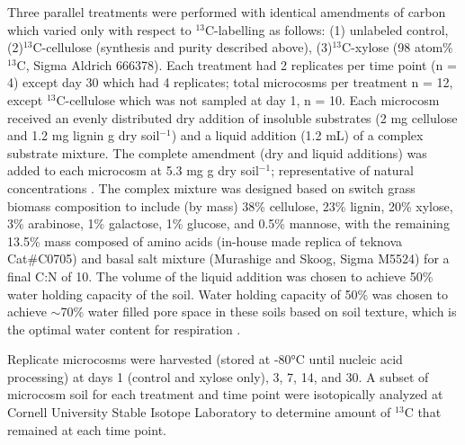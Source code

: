 Three parallel treatments were performed with identical amendments of carbon
which varied only with respect to $^{13}$C-labelling as follows:
(1) unlabeled control,(2)$^{13}$C-cellulose (synthesis and purity
described above), (3)$^{13}$C-xylose (98 atom\%
$^{13}$C, Sigma Aldrich 666378). Each treatment had 2 replicates
per time point (n = 4) except day 30 which had 4 replicates; total microcosms
per treatment n = 12, except $^{13}$C-cellulose which was not
sampled at day 1, n = 10. Each microcosm received an evenly distributed dry
addition of insoluble substrates (2 mg cellulose and 1.2 mg lignin g dry
soil$^{-1}$) and a liquid addition (1.2 mL) of a complex substrate
mixture. The complete amendment (dry and liquid additions) was added to each
microcosm at 5.3 mg g dry soil$^{-1}$; representative of natural
concentrations \cite{Schneckenberger_2008}. The complex mixture was designed
based on switch grass biomass composition \cite{Yan_2010,David_2010} to include
(by mass) 38\% cellulose, 23\% lignin, 20\% xylose, 3\% arabinose, 1\%
galactose, 1\% glucose, and 0.5\% mannose, with the remaining 13.5\% mass
composed of amino acids (in-house made replica of teknova Cat#C0705) and basal
salt mixture (Murashige and Skoog, Sigma M5524) for a final C:N of 10. The
volume of the liquid addition was chosen to achieve 50\% water holding capacity
of the soil. Water holding capacity of 50\% was chosen to achieve $\sim$70\%
water filled pore space in these soils based on soil texture, which is the
optimal water content for respiration \cite{Linn_1984,Linn_1984}.

Replicate microcosms were harvested (stored at -80°C until nucleic acid
processing) at days 1 (control and xylose only), 3, 7, 14, and 30. A subset of
microcosm soil for each treatment and time point were isotopically analyzed at
Cornell University Stable Isotope Laboratory to determine amount of
$^{13}$C that remained at each time point.   

